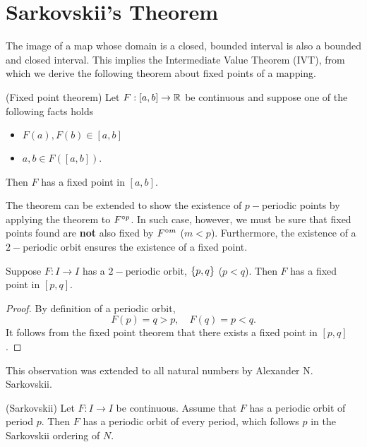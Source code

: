 \documentclass[12pt,twoside,draft]{book}
\begin{document}
\chapter{Sarkovskii's Theorem}
\label{appendix:sarkovskii}
The image of a map whose domain is a closed, bounded interval is also a bounded and closed interval.
This implies the Intermediate Value Theorem (IVT), from which we derive the following theorem about
fixed points of a mapping.
\begin{proposition}
  (Fixed point theorem)
  Let $F: [a,b] \to \mathbb{R}$ be continuous and suppose one of the following facts holds
  \begin{itemize}
    \item $F(a), F(b)\in [a,b]$
    \item $a, b\in F([a,b])$.
  \end{itemize}
  Then $F$ has a fixed point in $[a,b]$.
\end{proposition}
The theorem can be extended to show the existence of $p-$periodic points by applying the theorem to
$F^{\circ p}$. In such case, however, we must be sure that fixed points found are \textbf{not} also fixed by
$F^{\circ m}$ ($m < p$).
Furthermore, the existence of a $2-$periodic orbit ensures the existence of a fixed point.
\begin{proposition}
  Suppose $F: I\to I$ has a $2-$periodic orbit, $\left \{ p,q \right \}$ ($p<q$). Then $F$ has a fixed point in $[p,q]$.
\end{proposition}
\begin{proof}
  By definition of a periodic orbit, 
  \begin{equation*}
    F(p) = q > p, \quad F(q) = p < q.
  \end{equation*}
  It follows from the fixed point theorem that there exists a fixed point in $[p,q]$.
\end{proof}
This observation was extended to all natural numbers by Alexander N. Sarkovskii.
\begin{proposition}
  (Sarkovskii)
  Let $F: I\to I$ be continuous. Assume that $F$ has a periodic orbit of period $p$.
  Then $F$ has a periodic orbit of every period, which follows $p$ in the Sarkovskii
  ordering of $N$.
\end{proposition}
\end{document}
